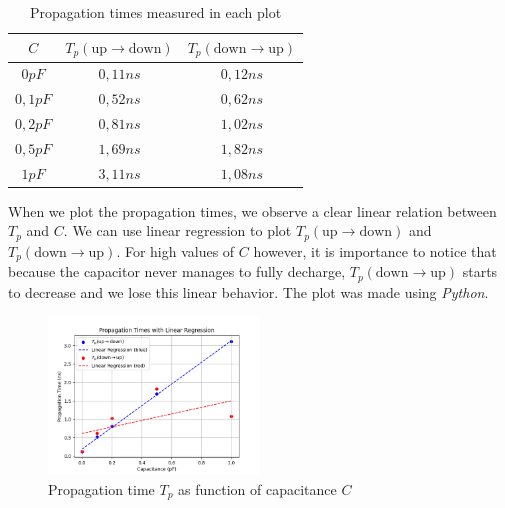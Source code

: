\documentclass[../main.tex]{subfiles}
\begin{document}
{		\begin{table}[htbp]
			\centering
			\renewcommand{\arraystretch}{1.5} %
			\begin{tabular}{|c|c|c|}
				\hline
				$C$ & $T_p(\text{up} \to \text{down})$ & $T_p(\text{down} \to \text{up})$ \\ \hline
				$0pF$ & $0,11ns$ & $0,12ns$ \\ \hline
				$0,1pF$ & $0,52ns$ & $0,62ns$ \\ \hline
				$0,2pF$ & $0,81ns$ & $1,02ns$ \\ \hline
				$0,5pF$ & $1,69ns$ & $1,82ns$ \\ \hline
				$1pF$   & $3,11ns$ & $1,08ns$ \\ \hline
			\end{tabular}
			\caption{Propagation times measured in each plot}
			\label{tab:transition}
		\end{table}
		
		When we plot the propagation times, we observe a clear linear relation between $T_p$ and $C$. We can use linear regression to plot $T_p(\text{up} \to \text{down})$ and $T_p(\text{down} \to \text{up})$. For high values of $C$ however, it is importance to notice that because the capacitor never manages to fully decharge, $T_p(\text{down} \to \text{up})$ starts to decrease and we lose this linear behavior. The plot was made using \textit{Python}.
		
		\begin{figure}[H]
			\centering
			\includegraphics[width=0.5\textwidth]{plots/Q6_plot.png}
			\caption{Propagation time $T_p$ as function of capacitance $C$}
		\end{figure}
		
	}
	
\end{document}
